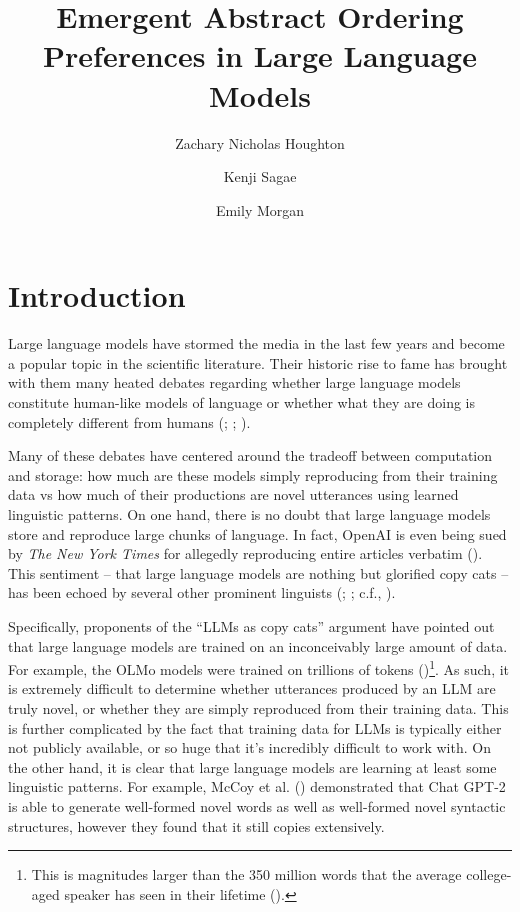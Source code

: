 \documentclass[
  nottoc]{article}
\title{Emergent Abstract Ordering Preferences in Large Language Models}
\author{Zachary Nicholas Houghton \and Kenji Sagae \and Emily Morgan}
\date{}
\begin{document}
\maketitle


\section{Introduction}\label{sec-introduction}

Large language models have stormed the media in the last few years and
become a popular topic in the scientific literature. Their historic rise
to fame has brought with them many heated debates regarding whether
large language models constitute human-like models of language or
whether what they are doing is completely different from humans
(;
;
).

Many of these debates have centered around the tradeoff between
computation and storage: how much are these models simply reproducing
from their training data vs how much of their productions are novel
utterances using learned linguistic patterns. On one hand, there is no
doubt that large language models store and reproduce large chunks of
language. In fact, OpenAI is even being sued by \emph{The New York
Times} for allegedly reproducing entire articles verbatim
(). This sentiment -- that large language
models are nothing but glorified copy cats -- has been echoed by several
other prominent linguists
(;
; c.f.,
).

Specifically, proponents of the ``LLMs as copy cats'' argument have
pointed out that large language models are trained on an inconceivably
large amount of data. For example, the OLMo models were trained on
trillions of tokens
()\footnote{This is magnitudes larger than the 350 million words
  that the average college-aged speaker has seen in their lifetime
  ().}. As such, it is
extremely difficult to determine whether utterances produced by an LLM
are truly novel, or whether they are simply reproduced from their
training data. This is further complicated by the fact that training
data for LLMs is typically either not publicly available, or so huge
that it's incredibly difficult to work with. On the other hand, it is
clear that large language models are learning at least some linguistic
patterns. For example, McCoy et al. ()
demonstrated that Chat GPT-2 is able to generate well-formed novel words
as well as well-formed novel syntactic structures, however they found
that it still copies extensively.
\end{document}
